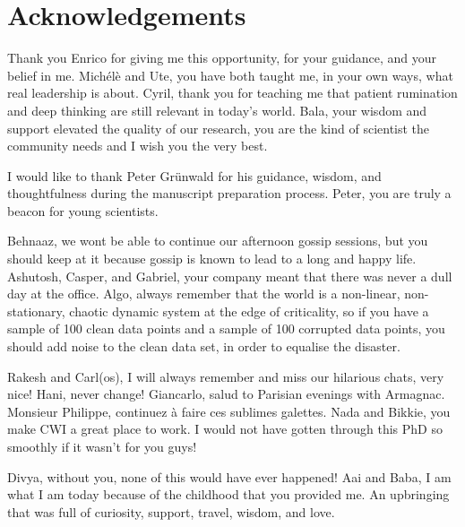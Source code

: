 \chapter*{Acknowledgements}\label{chapter:preface}

Thank you Enrico for giving me this opportunity, for your guidance, and your 
belief in me. Mich\'el\`e and Ute, you have both taught me, in your own ways, 
what real leadership is about. Cyril, thank you for teaching me that patient 
rumination and deep thinking are still relevant in today's world. Bala, 
your wisdom and support elevated the quality of our research, you are 
the kind of scientist the community needs and I wish you the very best.

I would like to thank Peter Gr\"{u}nwald for his guidance, wisdom, and 
thoughtfulness during the manuscript preparation process. Peter, you are truly 
a beacon for young scientists. 

Behnaaz, we wont be able to continue our afternoon gossip sessions, but you 
should keep at it because gossip is known to lead to a long and happy life. 
Ashutosh, Casper, and Gabriel, your company meant that there was never a dull 
day at the office. Algo, always remember that the world is a non-linear, 
non-stationary, chaotic dynamic system at the edge of criticality, so if 
you have a sample of 100 clean data points and a sample of 100 corrupted data 
points, you should add noise to the clean data set, in order to equalise the 
disaster.

Rakesh and Carl(os), I will always remember and miss our hilarious chats, very 
nice! Hani, never change! Giancarlo, salud to Parisian evenings with Armagnac. 
Monsieur Philippe, continuez \`a faire ces sublimes galettes.
%
Nada and Bikkie, you make CWI a great place to work. I would not have gotten 
through this PhD so smoothly if it wasn't for you guys!  

Divya, without you, none of this would have ever happened!
%
Aai and Baba, I am what I am today because of the childhood that you provided 
me. An upbringing that was full of curiosity, support, travel, wisdom, and love.